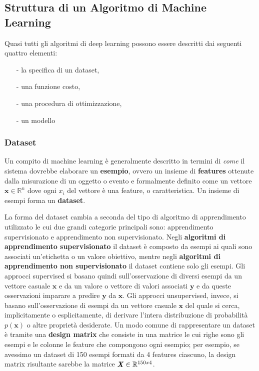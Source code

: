 \documentclass[12pt,a4paper]{report}
\begin{document}
    \newpage
    \subsection{Struttura di un Algoritmo di Machine Learning}
    Quasi tutti gli algoritmi di deep learning possono essere 
    descritti dai seguenti quattro elementi:
    \begin{itemize}
    \item[-] la specifica di un dataset,
    \item[-] una funzione costo,
    \item[-] una procedura di ottimizzazione,
    \item[-] un modello
    \end{itemize}
    
    \subsubsection{Dataset}
    Un compito di machine learning \`e generalmente descritto in 
    termini di \textit{come} il sistema dovrebbe elaborare un 
    \textbf{esempio}, ovvero un insieme di \textbf{features} 
    ottenute dalla misurazione di un oggetto o evento e formalmente
    definito come un vettore $\textbf{x} \in \mathbb{R}^n$ dove 
    ogni $x_i$ del vettore \`e una feature, o caratteristica. Un 
    insieme di esempi forma un \textbf{dataset}.
    
    \medskip
    La forma del dataset cambia a seconda del tipo di algoritmo di 
    apprendimento utilizzato le cui due grandi categorie principali
    sono: apprendimento supervisionato e apprendimento non 
    supervisionato. Negli \textbf{algoritmi di apprendimento 
    supervisionato} il dataset \`e composto da esempi ai quali 
    sono associati un'etichetta o un valore obiettivo, mentre negli
    \textbf{algoritmi di apprendimento non supervisionato} il 
    dataset contiene solo gli esempi. Gli approcci supervised si 
    basano quindi sull'osservazione di diversi esempi da un vettore
    casuale $\textbf{x}$ e da un valore o vettore di valori 
    associati $\textbf{y}$ e da queste osservazioni imparare a
    predire $\textbf{y}$ da $\textbf{x}$. Gli approcci 
    unsupervised, invece, si basano sull'osservazione di esempi 
    da un vettore casuale $\textbf{x}$ del quale si cerca, 
    implicitamente o esplicitamente, di derivare l'intera 
    distribuzione di probabilit\`a $p(\textbf{x})$ o altre 
    propriet\`a desiderate. Un modo comune di rappresentare un 
    dataset \`e tramite una \textbf{design matrix} che consiste in 
    una matrice le cui righe sono gli esempi e le colonne le 
    feature che compongono ogni esempio; per esempio, se avessimo 
    un dataset di 150 esempi formati da 4 features ciascuno, la 
    design matrix risultante sarebbe la matrice 
    $\textbf{\textit{X}}\in\mathbb{R}^{150x4}$.
    
\end{document}
